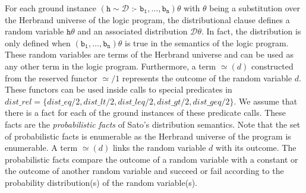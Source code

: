 \documentclass{tlp}
\newcommand{\coloneq}{\mbox{ :- }}
\newcommand{\val}{\simeq\!\!}
\begin{document}
For each ground instance $(\mathtt{h}\sim \mathcal{D} \coloneq
\mathtt{b_1,\ldots,b_n})\theta$ with $\theta$ being a substitution
over the Herbrand universe of the logic program, the distributional
clause defines a random variable $\mathtt{h}\theta$ and an associated
distribution $\mathcal{D}\theta$. In fact, the distribution is only
defined when $(\mathtt{b_1,\ldots,b_n})\theta$ is true in the
semantics of the logic program.  These random variables are terms of
the Herbrand universe and can be used as any other term in the logic
program.  Furthermore, a term $\val(d)$ constructed from the reserved
functor $\val/1$ represents the outcome of the random variable
$d$. These functors can be used inside calls to special predicates in
$dist\_rel =\{ dist\_eq/2, dist\_lt/2, dist\_leq/2, dist\_gt/2,
dist\_geq/2\}$.  We assume that there is a fact for each of the ground
instances of these predicate calls. These facts are the
\emph{probabilistic facts} of Sato's distribution semantics. Note that
the set of probabilistic facts is enumerable as the Herbrand universe
of the program is enumerable. A term $\val(d)$ links the random
variable $d$ with its outcome. The probabilistic facts compare the
outcome of a random variable with a constant or the outcome of another
random variable and succeed or fail according to the probability
distribution(s) of the random variable(s).
\end{document}
